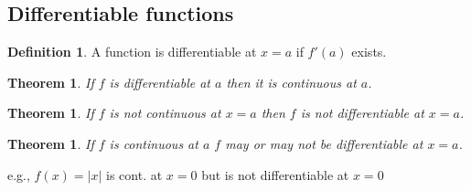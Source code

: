 \documentclass[t]{beamer}
\theoremstyle{plain}
\newtheorem{thm}[prop]{Theorem}
\theoremstyle{definition}
\newtheorem{dfn}{Definition}
\newcounter{heading}
\newcommand{\newhead}[1]{\medskip\stepcounter{heading}\noindent\textbf{\hspace{0.2cm}{#1}.}}
\begin{document}
\subsection{Differentiable functions}

%
%
%
%
%

\begin{frame}

\begin{dfn}
A function is differentiable at $x = a$ if $f'(a)$ exists.
\end{dfn}

\begin{thm}
If $f$ is differentiable at $a$ then it is continuous at $a$. 
\end{thm}

\begin{thm}
If $f$ is not continuous at $x = a$ then $f$ is not differentiable at $x=a$. 
\end{thm}

\begin{thm}
If $f$ is continuous at $a$ $f$ may or may not be differentiable at $x=a$. 
\end{thm}
e.g., $f(x) = |x|$ is cont. at $x=0$ but is not differentiable at $x =0$

\end{frame}
\end{document}
